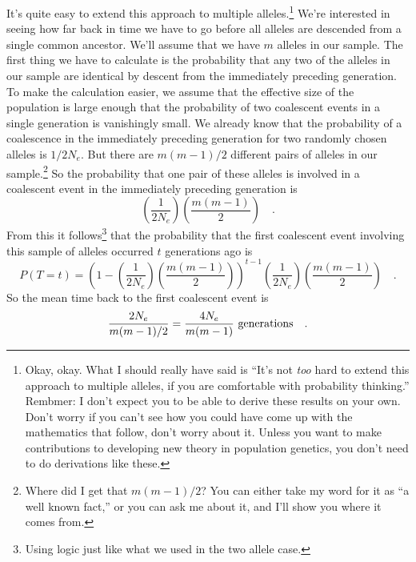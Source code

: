 \documentclass[12pt]{article}
\begin{document}
It's quite easy to extend this approach to multiple
alleles.\footnote{Okay, okay. What I should really have said is ``It's
  not {\it too\/} hard to extend this approach to multiple alleles, if
  you are comfortable with probability thinking.'' Rembmer: I don't
  expect you to be able to derive these results on your own. Don't
  worry if you can't see how you could have come up with the
  mathematics that follow, don't worry about it. Unless you want to
  make contributions to developing new theory in population genetics,
  you don't need to do derivations like these.}  We're interested in
seeing how far back in time we have to go before all alleles are
descended from a single common ancestor. We'll assume that we have $m$
alleles in our sample. The first thing we have to calculate is the
probability that any two of the alleles in our sample are identical by
descent from the immediately preceding generation. To make the
calculation easier, we assume that the effective size of the
population is large enough that the probability of two coalescent
events in a single generation is vanishingly small. We already know
that the probability of a coalescence in the immediately preceding
generation for two randomly chosen alleles is $1/2N_e$. But there are
$m(m-1)/2$ different pairs of alleles in our sample.\footnote{Where
  did I get that $m(m-1)/2$? You can either take my word for it as ``a
  well known fact,'' or you can ask me about it, and I'll show you
  where it comes from.} So the probability that one pair of these
alleles is involved in a coalescent event in the immediately preceding
generation is
\[
\left(\frac{1}{2N_e}\right)\left(\frac{m(m-1)}{2}\right) \quad .
\]
From this it follows\footnote{Using logic just like what we used in
the two allele case.} that the probability that the first coalescent
event involving this sample of alleles occurred $t$ generations ago is
\begin{equation}
P(T=t) = 
\left(1-\left(\frac{1}{2N_e}\right)\left(\frac{m(m-1)}{2}\right)\right)^{t-1}
\left(\frac{1}{2N_e}\right)\left(\frac{m(m-1)}{2}\right)
\quad .
\label{eq:multi-allele}
\end{equation}
So the mean time back to the first coalescent event is
\[
\frac{2N_e}{m(m-1)/2} = \frac{4N_e}{m(m-1)} \hbox{ generations} \quad .
\]
\end{document}
